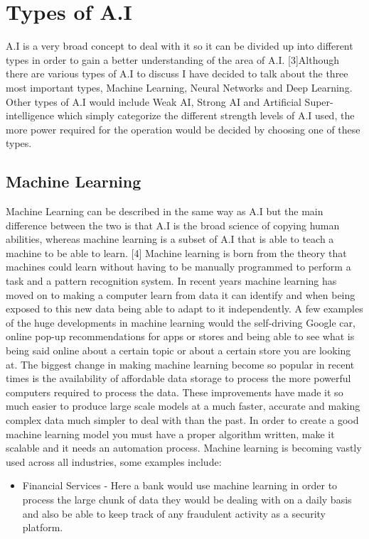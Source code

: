 \documentclass[letterpaper, 10 pt, conference]{ieeeconf}  %
\begin{document}
\section{Types of A.I}

A.I is a very broad concept to deal with it so it can be divided up into different types in order to gain a better understanding of the area of A.I. [3]Although there are various types of A.I to discuss I have decided to talk about the three most important types, Machine Learning, Neural Networks and Deep Learning. Other types of A.I would include Weak AI, Strong AI and Artificial Super-intelligence which simply categorize the different strength levels of A.I used, the more power required for the operation would be decided by choosing one of these types. 

\subsection{Machine Learning} 
Machine Learning can be described in the same way as A.I but the main difference between the two is that A.I is the broad science of copying human abilities, whereas machine learning is a subset of A.I that is able to teach a machine to be able to learn. [4] Machine learning is born from the theory that machines could learn without having to be manually programmed to perform a task and a pattern recognition system. In recent years machine learning has moved on to making a computer learn from data it can identify and when being exposed to this new data being able to adapt to it independently. A few examples of the huge developments in machine learning would the self-driving Google car, online pop-up recommendations for apps or stores and being able to see what is being said online about a certain topic or about a certain store you are looking at. 
The biggest change in making machine learning become so popular in recent times is the availability of affordable data storage to process the more powerful computers required to process the data. These improvements have made it so much easier to produce large scale models at a much faster, accurate and making complex data much simpler to deal with than the past. In order to create a good machine learning model you must have a proper algorithm written, make it scalable and it needs an automation process. Machine learning is becoming vastly used across all industries, some examples include: 
\begin{itemize}
\item Financial Services - Here a bank would use machine learning in order to process the large chunk of data they would be dealing with on a daily basis and also be able to keep track of any fraudulent activity as a security platform.
\end{itemize}
\end{document}
